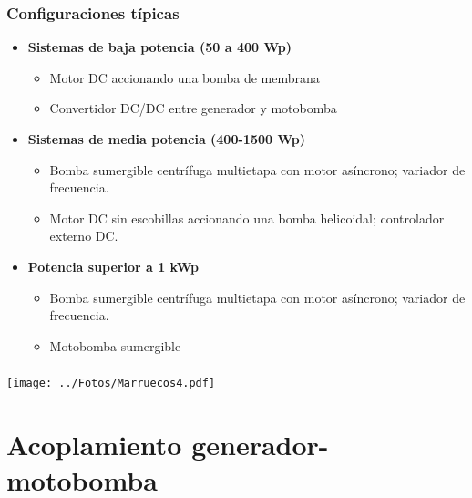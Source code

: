 \documentclass[serif, xcolor=dvipsnames]{beamer}
\begin{document}
\begin{frame}
\frametitle{Configuraciones típicas}
\begin{itemize}
\item \textbf{Sistemas de baja potencia (50 a 400 Wp)}

\begin{itemize}
\item Motor DC accionando una bomba de membrana
\item Convertidor DC/DC entre generador y motobomba
\end{itemize}
\item \textbf{Sistemas de media potencia (400-1500 Wp)}

\begin{itemize}
\item Bomba sumergible centrífuga multietapa con motor asíncrono; variador
de frecuencia.
\item Motor DC sin escobillas accionando una bomba helicoidal; controlador
externo DC.
\end{itemize}
\item \textbf{Potencia superior a 1 kWp}

\begin{itemize}
\item Bomba sumergible centrífuga multietapa con motor asíncrono; variador
de frecuencia.
\item Motobomba sumergible
\end{itemize}
\end{itemize}

\end{frame}

\begin{frame}[plain]
\frametitle{}

\begin{center}
\texttt{[image: ../Fotos/Marruecos4.pdf]}
\par\end{center}


\end{frame}

\section{Acoplamiento generador-motobomba}
\end{document}
